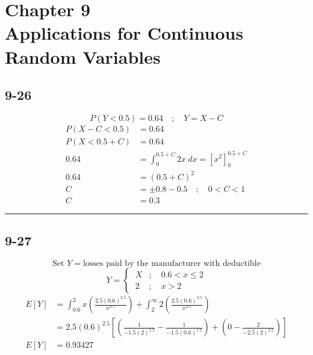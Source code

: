 \documentclass{article}
\newcommand{\qline}{\par\noindent\rule{4.5in}{1pt}}
\begin{document}
	\clearpage

	\section[Chapter 9: Applications for Continuous Random Variables]{Chapter 9 \\
		Applications for Continuous Random Variables}

		\subsection*{9-26}

			\[
				P(Y < 0.5) = 0.64 \quad;\quad Y = X - C
			\]
			\begin{equation*}
				\begin{split}
					P(X-C < 0.5) &= 0.64 \\
					P(X < 0.5 + C) &= 0.64 \\
					0.64 &= \int_{0}^{0.5 + C} 2x \ dx = \left[ x^2 \right]^{0.5 + C}_0 \\
					0.64 &= (0.5 + C)^2 \\
					C &= \pm 0.8 - 0.5 \quad;\quad 0 < C < 1 \\
					C &= \boxed{0.3}
				\end{split}
			\end{equation*}

	\qline

		\subsection*{9-27}

			\[
				\text{Set } Y = \text{losses paid by the manufacturer with deductible}
			\]
			\begin{equation*}
				Y =
				\begin{cases}
					\ X  &; \quad  0.6 < x \leq 2 \\
					\ 2  &; \quad  x > 2
				\end{cases}
			\end{equation*}
			\begin{equation*}
				\begin{split}
					E[Y] &= \int_{0.6}^{2} x\left( \frac{2.5(0.6)^{2.5}}{x^{3.5}} \right) + \int_{2}^{\infty} 2\left( \frac{2.5(0.6)^{2.5}}{x^{3.5}} \right) \\
					&= 2.5(0.6)^{2.5} \left[ \left( \frac{1}{-1.5(2)^{1.5}} - \frac{1}{-1.5(0.6)^{1.5}} \right) + \left( 0 - \frac{2}{-2.5(2)^{2.5}} \right) \right] \\
					E[Y] &= \boxed{0.93427}
				\end{split}
			\end{equation*}
\end{document}
